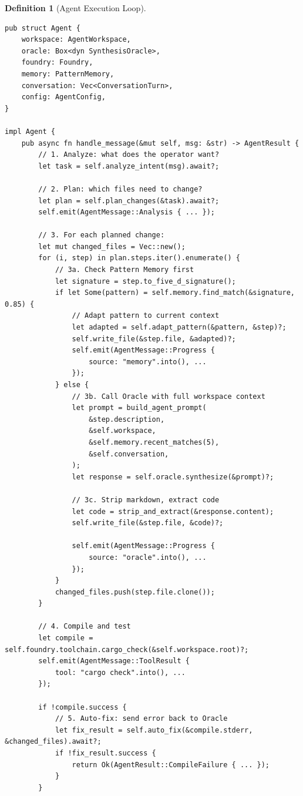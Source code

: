 \documentclass[11pt,a4paper,twoside]{article}
\theoremstyle{definition}
\newtheorem{definition}{Definition}[section]
\theoremstyle{remark}
\begin{document}
\begin{definition}[Agent Execution Loop]\label{def:execloop}
\begin{lstlisting}
pub struct Agent {
    workspace: AgentWorkspace,
    oracle: Box<dyn SynthesisOracle>,
    foundry: Foundry,
    memory: PatternMemory,
    conversation: Vec<ConversationTurn>,
    config: AgentConfig,
}

impl Agent {
    pub async fn handle_message(&mut self, msg: &str) -> AgentResult {
        // 1. Analyze: what does the operator want?
        let task = self.analyze_intent(msg).await?;

        // 2. Plan: which files need to change?
        let plan = self.plan_changes(&task).await?;
        self.emit(AgentMessage::Analysis { ... });

        // 3. For each planned change:
        let mut changed_files = Vec::new();
        for (i, step) in plan.steps.iter().enumerate() {
            // 3a. Check Pattern Memory first
            let signature = step.to_five_d_signature();
            if let Some(pattern) = self.memory.find_match(&signature, 0.85) {
                // Adapt pattern to current context
                let adapted = self.adapt_pattern(&pattern, &step)?;
                self.write_file(&step.file, &adapted)?;
                self.emit(AgentMessage::Progress {
                    source: "memory".into(), ...
                });
            } else {
                // 3b. Call Oracle with full workspace context
                let prompt = build_agent_prompt(
                    &step.description,
                    &self.workspace,
                    &self.memory.recent_matches(5),
                    &self.conversation,
                );
                let response = self.oracle.synthesize(&prompt)?;

                // 3c. Strip markdown, extract code
                let code = strip_and_extract(&response.content);
                self.write_file(&step.file, &code)?;

                self.emit(AgentMessage::Progress {
                    source: "oracle".into(), ...
                });
            }
            changed_files.push(step.file.clone());
        }

        // 4. Compile and test
        let compile = self.foundry.toolchain.cargo_check(&self.workspace.root)?;
        self.emit(AgentMessage::ToolResult {
            tool: "cargo check".into(), ...
        });

        if !compile.success {
            // 5. Auto-fix: send error back to Oracle
            let fix_result = self.auto_fix(&compile.stderr, &changed_files).await?;
            if !fix_result.success {
                return Ok(AgentResult::CompileFailure { ... });
            }
        }


\end{lstlisting}
\end{definition}
\end{document}
